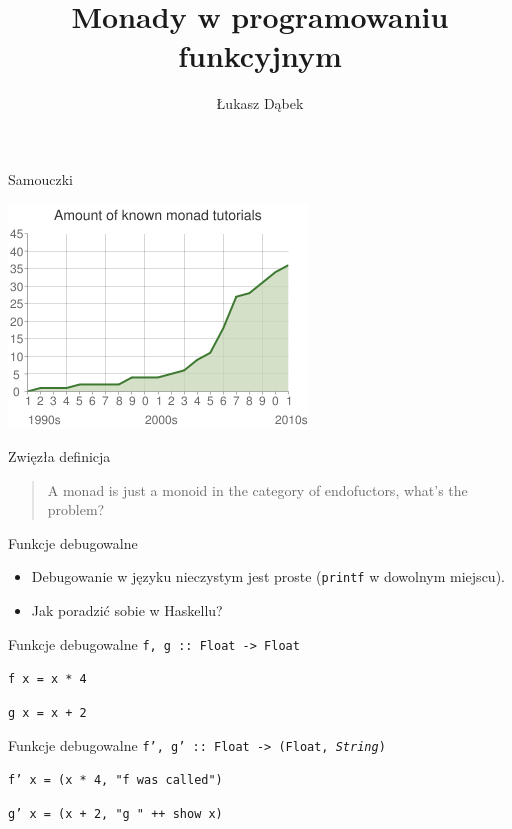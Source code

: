 \documentclass[14pt]{beamer}
\title{Monady w programowaniu funkcyjnym}
\author{Łukasz Dąbek}
\begin{document}
\begin{frame}[plain]
    \titlepage
\end{frame}

\begin{frame}{Samouczki}
    \begin{center}
        \includegraphics[scale=0.5]{monads-timeline.png}
    \end{center}
\end{frame}

\begin{frame}{Zwięzła definicja}
    \begin{quote}
        A monad is just a monoid in the category of endofuctors,
        what's the problem?
        \vskip5mm
        \hspace*{} 
    \end{quote}
\end{frame}


\begin{frame}{Funkcje debugowalne}
    \begin{itemize}
        \item Debugowanie w języku nieczystym jest proste
            (\texttt{printf} w dowolnym miejscu).
        \pause
        \item Jak poradzić sobie w Haskellu?
    \end{itemize}
\end{frame}

\begin{frame}{Funkcje debugowalne}
    \texttt{f, g :: Float -> Float}
    \pause

    \texttt{f x = x * 4}

    \texttt{g x = x + 2}
\end{frame}

\begin{frame}{Funkcje debugowalne}
    \texttt{f', g' :: Float -> (Float, \emph{String})}
    \pause

    \texttt{f' x = (x * 4, "f was called")}

    \texttt{g' x = (x + 2, "g " ++ show x)}
\end{frame}
\end{document}
